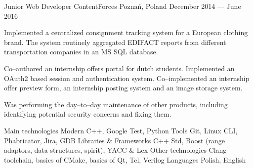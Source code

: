 \documentclass[11pt, a4paper]{awesome-cv}
\begin{document}
\begin{cventries}
  \cventry
    {Junior Web Developer} %
    {ContentForces} %
    {Poznań, Poland} %
    {December 2014 --- June 2016} %
    {
      \begin{cvitems} %
        \item {Implemented a centralized consignment tracking system for a European clothing brand. The system routinely aggregated EDIFACT reports from different transportation companies in an MS SQL database.}
        \item {Co--authored an internship offers portal for dutch students. Implemented an OAuth2 based session and authentication system. Co--implemented an internship offer preview form, an internship posting system and an image storage system.}
        \item {Was performing the day--to--day maintenance of other products, including identifying potential security concerns and fixing them.}
      \end{cvitems}
    }
\end{cventries}

\begin{cvskills}
  \cvskill
    {Main technologies} %
    {Modern C++, Google Test, Python} %
  \cvskill
    {Tools} %
    {Git, Linux CLI, Phabricator, Jira, GDB} %
  \cvskill
    {Libraries \& Frameworks} %
    {C++ Std, Boost (range adaptors, data structures, spirit), YACC \& Lex}
  \cvskill
    {Other technologies} %
    {Clang toolchain, basics of CMake, basics of Qt, Tcl, Verilog} %
  \cvskill
    {Languages} %
    {Polish, English} %
\end{cvskills}
\end{document}
